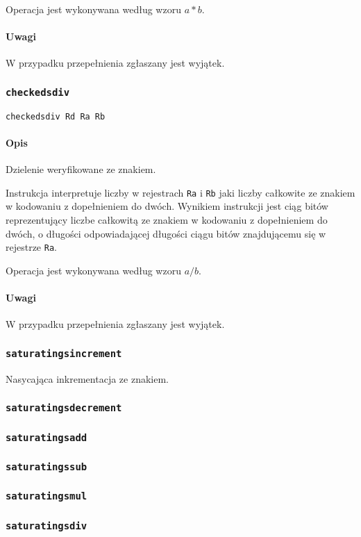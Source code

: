 Operacja jest wykonywana według wzoru $a * b$.

\paragraph*{Uwagi}

W przypadku przepełnienia zgłaszany jest wyjątek.

\subsubsection{\texttt{checkedsdiv}}

\begin{lstlisting}
checkedsdiv Rd Ra Rb
\end{lstlisting}

\paragraph*{Opis} Dzielenie weryfikowane ze znakiem.

Instrukcja interpretuje liczby w rejestrach \texttt{Ra} i \texttt{Rb} jaki
liczby całkowite ze znakiem w kodowaniu z dopełnieniem do dwóch. Wynikiem
instrukcji jest ciąg bitów reprezentujący liczbe całkowitą ze znakiem w
kodowaniu z dopełnieniem do dwóch, o długości odpowiadającej długości ciągu
bitów znajdującemu się w rejestrze \texttt{Ra}.

Operacja jest wykonywana według wzoru $a / b$.

\paragraph*{Uwagi}

W przypadku przepełnienia zgłaszany jest wyjątek.

\subsubsection{\texttt{saturatingsincrement}}

Nasycająca inkrementacja ze znakiem.

\subsubsection{\texttt{saturatingsdecrement}}
\subsubsection{\texttt{saturatingsadd}}
\subsubsection{\texttt{saturatingssub}}
\subsubsection{\texttt{saturatingsmul}}
\subsubsection{\texttt{saturatingsdiv}}
